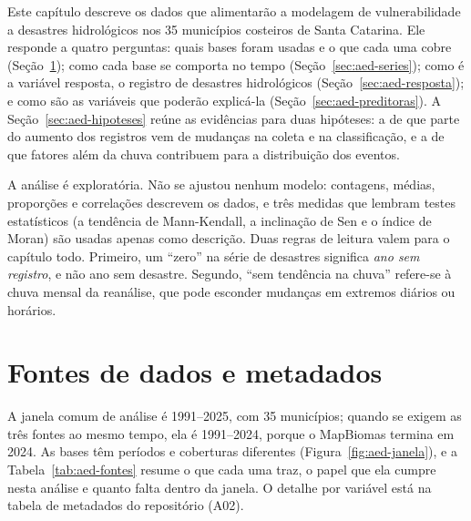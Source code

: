 %

Este capítulo descreve os dados que alimentarão a modelagem de vulnerabilidade a desastres hidrológicos nos 35 municípios costeiros de Santa Catarina. Ele responde a quatro perguntas: quais bases foram usadas e o que cada uma cobre (Seção~\ref{sec:aed-fontes}); como cada base se comporta no tempo (Seção~\ref{sec:aed-series}); como é a variável resposta, o registro de desastres hidrológicos (Seção~\ref{sec:aed-resposta}); e como são as variáveis que poderão explicá-la (Seção~\ref{sec:aed-preditoras}). A Seção~\ref{sec:aed-hipoteses} reúne as evidências para duas hipóteses: a de que parte do aumento dos registros vem de mudanças na coleta e na classificação, e a de que fatores além da chuva contribuem para a distribuição dos eventos.

A análise é exploratória. Não se ajustou nenhum modelo: contagens, médias, proporções e correlações descrevem os dados, e três medidas que lembram testes estatísticos (a tendência de Mann-Kendall, a inclinação de Sen e o índice de Moran) são usadas apenas como descrição. Duas regras de leitura valem para o capítulo todo. Primeiro, um ``zero'' na série de desastres significa \emph{ano sem registro}, e não ano sem desastre. Segundo, ``sem tendência na chuva'' refere-se à chuva mensal da reanálise, que pode esconder mudanças em extremos diários ou horários.

\section{Fontes de dados e metadados}
\label{sec:aed-fontes}

A janela comum de análise é 1991--2025, com 35 municípios; quando se exigem as três fontes ao mesmo tempo, ela é 1991--2024, porque o MapBiomas termina em 2024. As bases têm períodos e coberturas diferentes (Figura~\ref{fig:aed-janela}), e a Tabela~\ref{tab:aed-fontes} resume o que cada uma traz, o papel que ela cumpre nesta análise e quanto falta dentro da janela. O detalhe por variável está na tabela de metadados do repositório (A02).

